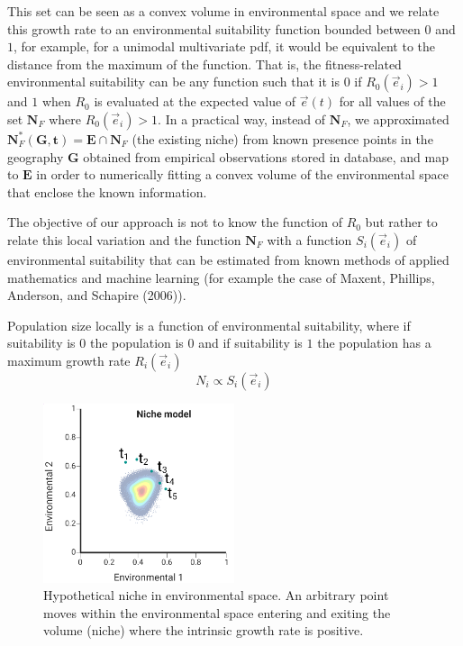 \documentclass[
]{article}
\begin{document}
This set can be seen as a convex volume in environmental space and we
relate this growth rate to an environmental suitability function bounded
between \(0\) and \(1\), for example, for a unimodal multivariate pdf,
it would be equivalent to the distance from the maximum of the function.
That is, the fitness-related environmental suitability can be any
function such that it is \(0\) if \(R_0(\vec{e}_i) > 1\) and \(1\) when
\(R_0\) is evaluated at the expected value of \(\vec {e}(t)\) for all
values of the set \(\mathbf{N}_F\) where \(R_0(\vec{e}_i) > 1\). In a
practical way, instead of \(\mathbf{N}_F\), we approximated
\(\mathbf{N}_F^{*}(\mathbf{G, t}) = \mathbf{E} \cap \mathbf{N}_F\) (the
existing niche) from known presence points in the geography
\(\mathbf{G}\) obtained from empirical observations stored in database,
and map to \(\mathbf{E}\) in order to numerically fitting a convex
volume of the environmental space that enclose the known information.

The objective of our approach is not to know the function of \(R_0\) but
rather to relate this local variation and the function \(\mathbf{N}_F\)
with a function \(S_i(\vec{e}_i)\) of environmental suitability that can
be estimated from known methods of applied mathematics and machine
learning (for example the case of Maxent, Phillips, Anderson, and
Schapire (2006)).

Population size locally is a function of environmental suitability,
where if suitability is \(0\) the population is \(0\) and if suitability
is \(1\) the population has a maximum growth rate \(R_i(\vec{e}_i)\) \[
N_i \propto  S_i(\vec{e}_i)
\]

\begin{figure}
\centering
\includegraphics[width=0.5\textwidth,height=\textheight]{all_figures/figure_1.png}
\caption{Hypothetical niche in environmental space. An arbitrary point
moves within the environmental space entering and exiting the volume
(niche) where the intrinsic growth rate is positive.}
\end{figure}
\end{document}
